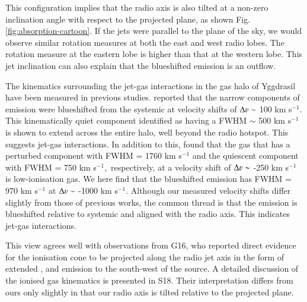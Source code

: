 This configuration implies that the radio axis is also tilted at a non-zero inclination angle with respect to the projected plane, as shown Fig. \ref{fig:absorption-cartoon}. If the jets were parallel to the plane of the sky, we would observe similar rotation measures at both the east and west radio lobes. The rotation measure at the eastern lobe is higher than that at the western lobe. This jet inclination can also explain that the blueshifted emission is an outflow.


The kinematics surrounding the jet-gas interactions in the gas halo of Yggdrasil have been measured in previous studies. \citet{villar-martin2003} reported that the narrow components of  emission were blueshifted from the systemic at velocity shifts of $\Delta \varv \sim$ 100 km s$^{-1}.$ This kinematically quiet component identified as having a FWHM $\sim$ 500 km s$^{-1}$ is shown to extend across the entire halo, well beyond the radio hotspot. This suggests jet-gas interactions. In addition to this, \citet{humphrey2006} found that the  gas that has a perturbed component with FWHM = 1760 km s$^{-1}$ and the quiescent component with FWHM = 750 km s$^{-1},$ respectively, at a velocity shift of $\Delta \varv \sim$ -250 km s$^{-1}$ is low-ionisation gas. We here find that the blueshifted emission has FWHM = 970 km s$^{-1}$ at $\Delta \varv \sim$ -1000 km s$^{-1}.$ Although our measured velocity shifts differ slightly from those of previous works, the common thread is that the  emission is blueshifted relative to systemic and aligned with the radio axis. This indicates jet-gas interactions.  

This view agrees well with observations from G16, who reported direct evidence for the ionisation cone to be projected along the radio jet axis in the form of extended ,  and \ion{C}{III]} emission to the south-west of the source. A detailed discussion of the ionised gas kinematics is presented in S18. Their interpretation differs from ours only slightly in that our radio axis is tilted relative to the projected plane. 

